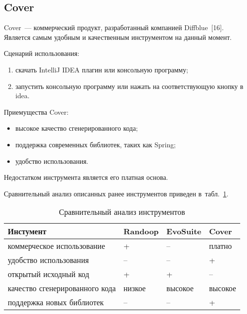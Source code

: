 \subsection{Cover}

Cover~--- коммерческий продукт, разработанный компанией Diffblue~[16]. Является самым удобным и качественным инструментом
на данный момент.

Сценарий использования: 

\begin{enumerate}
	\item скачать IntelliJ IDEA плагин или консольную программу;
	\item запустить консольную программу или нажать на соответствующую кнопку в idea.
\end{enumerate}

Приемущества Cover: 

\begin{itemize}
	\item высокое качество сгенерированного кода;
	\item поддержка современных библиотек, таких как Spring;
	\item удобство использования.
\end{itemize}

Недостатком инструмента является его платная основа.


Сравнительный анализ описанных ранее инструментов приведен в~табл.~\ref{analys}.
\begin{table} [h!tbp]
	\centering
	\changecaptionwidth\captionwidth{14.75cm}
	\caption{Сравнительный анализ инструментов}\label{analys}%
	\begin{tabular}{| p{7cm} | p{2cm} | p{2cm} | p{2cm} |} \hline
		\textbf{Инстумент}							 	 		  &	\textbf{Randoop}	&	\textbf{EvoSuite}	&	\textbf{Cover}			\\ \hline
		коммерческое использование  					& 	+						   & 		--						& платно						\\ \hline
		удобство использования 					 			 & -- 							& -- 							 & +						      	\\ \hline
		открытый исходный код 					 			  & +							& +							      & --						      	\\ \hline
		качество сгенерированного кода 			    	 & низкое				  & высокое					   & высокое					\\ \hline
		поддержка новых библиотек  	                       & --				            & --					   		   & +						 		\\ \hline
	\end{tabular}
\end{table}	 
























